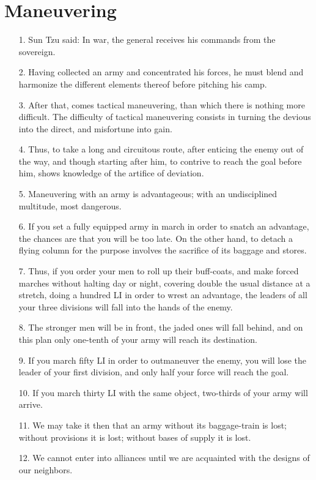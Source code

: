 \documentclass[11pt,openany]{memoir}
\newcommand{\enumeratemargin}{1.30em}
\begin{document}
\chapter{Maneuvering}
\begin{enumerate}[leftmargin=\enumeratemargin]
\item[1.] Sun Tzu said: In war, the general receives his commands from the sovereign.
\item[2.] Having collected an army and concentrated his forces, he must blend and harmonize the different elements thereof before pitching his camp.
\item[3.] After that, comes tactical maneuvering, than which there is nothing more difficult. The difficulty of tactical maneuvering consists in turning the devious into the direct, and misfortune into gain.
\item[4.] Thus, to take a long and circuitous route, after enticing the enemy out of the way, and though starting after him, to contrive to reach the goal before him, shows knowledge of the artifice of deviation.
\item[5.] Maneuvering with an army is advantageous; with an undisciplined multitude, most dangerous.
\item[6.] If you set a fully equipped army in march in order to snatch an advantage, the chances are that you will be too late. On the other hand, to detach a flying column for the purpose involves the sacrifice of its baggage and stores.
\item[7.] Thus, if you order your men to roll up their buff-coats, and make forced marches without halting day or night, covering double the usual distance at a stretch, doing a hundred LI in order to wrest an advantage, the leaders of all your three divisions will fall into the hands of the enemy.
\item[8.] The stronger men will be in front, the jaded ones will fall behind, and on this plan only one-tenth of your army will reach its destination.
\item[9.] If you march fifty LI in order to outmaneuver the enemy, you will lose the leader of your first division, and only half your force will reach the goal.
\item[10.] If you march thirty LI with the same object, two-thirds of your army will arrive.
\item[11.] We may take it then that an army without its baggage-train is lost; without provisions it is lost; without bases of supply it is lost.
\item[12.] We cannot enter into alliances until we are acquainted with the designs of our neighbors.

\end{enumerate}
\end{document}
